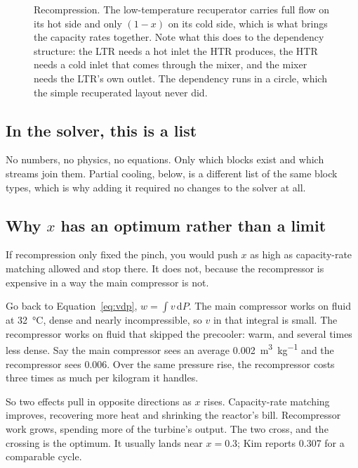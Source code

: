 \documentclass[11pt,a4paper]{report}
\begin{document}
\begin{figure}[htbp]
\centering

\caption{Recompression. The low-temperature recuperator carries full flow on
its hot side and only $(1-x)$ on its cold side, which is what brings the
capacity rates together. Note what this does to the dependency structure:
the LTR needs a hot inlet the HTR produces, the HTR needs a cold inlet that
comes through the mixer, and the mixer needs the LTR's own outlet. The
dependency runs in a circle, which the simple recuperated layout never did.}
\label{fig:recompression}
\end{figure}

\subsection{In the solver, this is a list}


\noindent No numbers, no physics, no equations. Only which blocks exist and
which streams join them. Partial cooling, below, is a different list of the
same block types, which is why adding it required no changes to the solver
at all.

\subsection{Why $x$ has an optimum rather than a limit}
\label{sec:xopt}

If recompression only fixed the pinch, you would push $x$ as high as
capacity-rate matching allowed and stop there. It does not, because the
recompressor is expensive in a way the main compressor is not.

Go back to Equation~\eqref{eq:vdp}, $w = \int v\,\mathrm{d}P$. The main
compressor works on fluid at \SI{32}{\celsius}, dense and nearly
incompressible, so $v$ in that integral is small. The recompressor works on
fluid that skipped the precooler: warm, and several times less dense. Say
the main compressor sees an average
\SI{0.002}{\metre\cubed\per\kilogram} and the recompressor sees
\SI{0.006}{}. Over the same pressure rise, the recompressor costs three
times as much per kilogram it handles.

So two effects pull in opposite directions as $x$ rises. Capacity-rate
matching improves, recovering more heat and shrinking the reactor's bill.
Recompressor work grows, spending more of the turbine's output. The two
cross, and the crossing is the optimum. It usually lands near $x = 0.3$;
Kim reports \num{0.307} for a comparable cycle.
\end{document}
